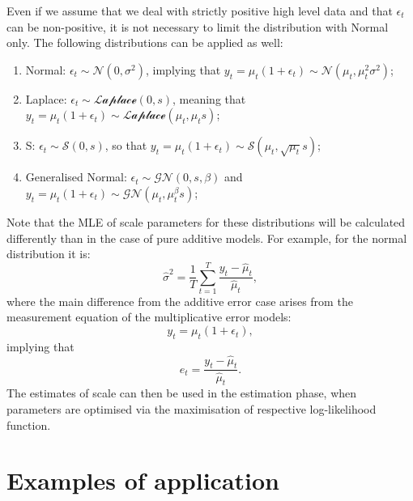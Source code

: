 \documentclass[
]{book}
\providecommand{\tightlist}{%
  \setlength{\itemsep}{0pt}\setlength{\parskip}{0pt}}
\theoremstyle{definition}
\theoremstyle{definition}
\theoremstyle{definition}
\theoremstyle{definition}
\theoremstyle{remark}
\begin{document}
Even if we assume that we deal with strictly positive high level data and that \(\epsilon_t\) can be non-positive, it is not necessary to limit the distribution with Normal only. The following distributions can be applied as well:

\begin{enumerate}
\def\labelenumi{\arabic{enumi}.}
\tightlist
\item
  Normal: \(\epsilon_t \sim \mathcal{N}(0, \sigma^2)\), implying that \(y_t = \mu_t (1+\epsilon_t) \sim \mathcal{N}(\mu_t, \mu_t^2 \sigma^2)\);
\item
  Laplace: \(\epsilon_t \sim \mathcal{Laplace}(0, s)\), meaning that \(y_t = \mu_t (1+\epsilon_t) \sim \mathcal{Laplace}(\mu_t, \mu_t s)\);
\item
  S: \(\epsilon_t \sim \mathcal{S}(0, s)\), so that \(y_t = \mu_t (1+\epsilon_t) \sim \mathcal{S}(\mu_t, \sqrt{\mu_t} s)\);
\item
  Generalised Normal: \(\epsilon_t \sim \mathcal{GN}(0, s, \beta)\) and \(y_t = \mu_t (1+\epsilon_t) \sim \mathcal{GN}(\mu_t, \mu_t^\beta s)\);
\end{enumerate}

Note that the MLE of scale parameters for these distributions will be calculated differently than in the case of pure additive models. For example, for the normal distribution it is:
\begin{equation}
    \hat{\sigma}^2 = \frac{1}{T}\sum_{t=1}^T \frac{y_t-\hat{\mu}_t}{\hat{\mu}_t} ,
    \label{eq:ETSMultiplicativeErrorMLESigmaNormal}
\end{equation}
where the main difference from the additive error case arises from the measurement equation of the multiplicative error models:
\begin{equation}
    y_t = \mu_t (1+\epsilon_t),
    \label{eq:ETSMultiplicativeErrorMeasurement}
\end{equation}
implying that
\begin{equation}
    e_t = \frac{y_t-\hat{\mu}_t}{\hat{\mu}_t}.
    \label{eq:ETSMultiplicativeErrorFormula}
\end{equation}
The estimates of scale can then be used in the estimation phase, when parameters are optimised via the maximisation of respective log-likelihood function.

\hypertarget{ADAMETSMultiplicativeExamples}{%
\section{Examples of application}\label{ADAMETSMultiplicativeExamples}}
\end{document}
